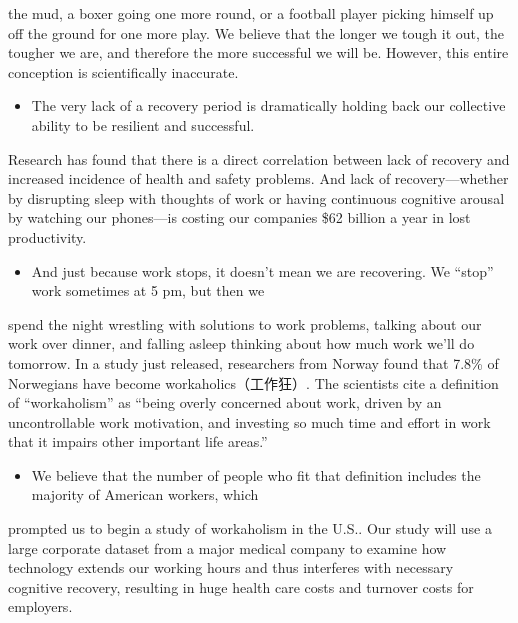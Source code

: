 \documentclass[UTF8,11pt]{ctexart}
\begin{document}
the mud, a boxer going one more round, or a football player picking himself up off the ground for one more play. We believe that the longer we tough it out, the tougher we are, and therefore the more successful we will be. However, this entire conception is scientifically inaccurate.


\begin{itemize}[leftmargin=2em,itemsep=.2em,topsep=.4em]\item[D.] The very lack of a recovery period is dramatically holding back our collective ability to be resilient and successful.
\end{itemize}

Research has found that there is a direct correlation between lack of recovery and increased incidence of health and safety problems. And lack of recovery—whether by disrupting sleep with thoughts of work or having continuous cognitive arousal by watching our phones—is costing our companies \$62 billion a year in lost productivity.


\begin{itemize}[leftmargin=2em,itemsep=.2em,topsep=.4em]\item[E.] And just because work stops, it doesn’t mean we are recovering. We “stop” work sometimes at 5 pm, but then we
\end{itemize}

spend the night wrestling with solutions to work problems, talking about our work over dinner, and falling asleep thinking about how much work we’ll do tomorrow. In a study just released, researchers from Norway found that 7.8\% of Norwegians have become workaholics（工作狂）. The scientists cite a definition of “workaholism” as “being overly concerned about work, driven by an uncontrollable work motivation, and investing so much time and effort in work that it impairs other important life areas.”


\begin{itemize}[leftmargin=2em,itemsep=.2em,topsep=.4em]\item[F.] We believe that the number of people who fit that definition includes the majority of American workers, which
\end{itemize}

prompted us to begin a study of workaholism in the U.S.. Our study will use a large corporate dataset from a major medical company to examine how technology extends our working hours and thus interferes with necessary cognitive recovery, resulting in huge health care costs and turnover costs for employers.
\end{document}

